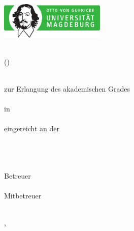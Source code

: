\begin{titlepage}
\begin{center}
\includegraphics[width=50mm]{figures/ovgu_nat_logo}
~
\vfill\vfill\vfill

\sffamily

\myauthor\\
{\footnotesize (\myid)}\\

\bigskip
\vfill

{\LARGE\bfseries\mytitle}

{\large\bfseries\mysubtitle}

\vfill\vfill\vfill\vfill

{\normalsize\bfseries\myworktitle}\\
\vfill
zur Erlangung des akademischen Grades\\
{\mygrade}\\
in\\
{\mystudy}\\
\bigskip
\vfill
eingereicht an der\\
{\normalsize\bfseries\myuniversity}\\
\medskip
\myfaculty\\
\smallskip
\myinstitute\\


\vfill\vfill\vfill
\vfill\vfill\vfill

Betreuer\\
\mysupervisor\\
\vfill
Mitbetreuer\\
\mycosupervisor\\
\vfill
\vfill

\vfill


\vfill\vfill\vfill

{\scriptsize\mysubmissiontown, \mysubmissionmonth~\mysubmissionyear}

\end{center}
\end{titlepage}

\newpage

